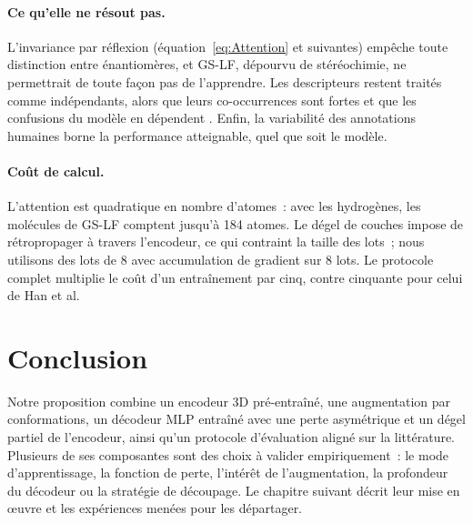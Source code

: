 \paragraph{Ce qu'elle ne résout pas.}
L'invariance par réflexion (équation~\ref{eq:Attention} et suivantes) empêche toute distinction entre énantiomères, et GS-LF, dépourvu de stéréochimie, ne permettrait de toute façon pas de l'apprendre.
Les descripteurs restent traités comme indépendants, alors que leurs co-occurrences sont fortes et que les confusions du modèle en dépendent \cite{Han-2026}.
Enfin, la variabilité des annotations humaines borne la performance atteignable, quel que soit le modèle.

\paragraph{Coût de calcul.}
L'attention est quadratique en nombre d'atomes~: avec les hydrogènes, les molécules de GS-LF comptent jusqu'à 184 atomes.
Le dégel de couches impose de rétropropager à travers l'encodeur, ce qui contraint la taille des lots~; nous utilisons des lots de 8 avec accumulation de gradient sur 8 lots.
Le protocole complet multiplie le coût d'un entraînement par cinq, contre cinquante pour celui de Han et al.


\section{Conclusion}
\label{sec:ConclusionProposition}

Notre proposition combine un encodeur 3D pré-entraîné, une augmentation par conformations, un décodeur MLP entraîné avec une perte asymétrique et un dégel partiel de l'encodeur, ainsi qu'un protocole d'évaluation aligné sur la littérature.
Plusieurs de ses composantes sont des choix à valider empiriquement~: le mode d'apprentissage, la fonction de perte, l'intérêt de l'augmentation, la profondeur du décodeur ou la stratégie de découpage.
Le chapitre suivant décrit leur mise en œuvre et les expériences menées pour les départager.
